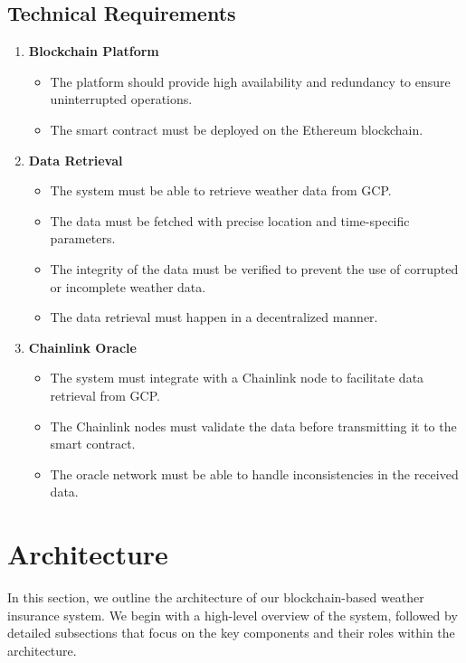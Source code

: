 \subsection{Technical Requirements}\label{subsection:technicalRequirements}
\begin{enumerate}
    \item \textbf{Blockchain Platform}
    \begin{itemize}
        \item The platform should provide high availability and redundancy to ensure uninterrupted operations.
        \item The smart contract must be deployed on the Ethereum blockchain.
    \end{itemize}
    
    \item \textbf{Data Retrieval}
    \begin{itemize}
        \item The system must be able to retrieve weather data from GCP.
        \item The data must be fetched with precise location and time-specific parameters.  
        \item The integrity of the data must be verified to prevent the use of corrupted or incomplete weather data. 
        \item The data retrieval must happen in a decentralized manner.
    \end{itemize}
    
    \item \textbf{Chainlink Oracle}
    \begin{itemize}
        \item The system must integrate with a Chainlink node to facilitate data retrieval from GCP.
        \item The Chainlink nodes must validate the data before transmitting it to the smart contract. 
        \item The oracle network must be able to handle inconsistencies in the received data.
    \end{itemize}
\end{enumerate}

\section{Architecture}
In this section, we outline the architecture of our blockchain-based weather insurance system. We begin with a high-level overview of the system, followed by detailed subsections that focus on the key components and their roles within the architecture.

